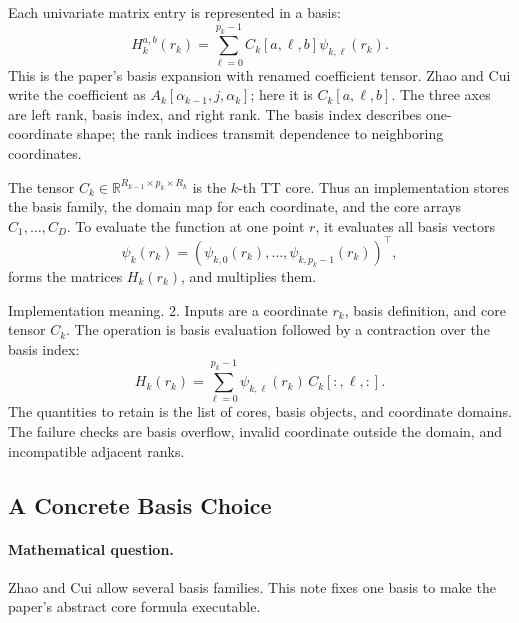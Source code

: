 \documentclass[11pt]{article}
\numberwithin{equation}{section}
\newcommand{\R}{\mathbb R}
\begin{document}
Each univariate matrix entry is represented in a basis:
\begin{equation}
    H_k^{a,b}(r_k)
    =
    \sum_{\ell=0}^{p_k-1}
    C_k[a,\ell,b]\psi_{k,\ell}(r_k).
    \label{eq:p24-tt-3}
\end{equation}
This is the paper's basis expansion with renamed coefficient tensor.  Zhao and Cui \cite{zhao2024ttsequential}
write the coefficient as \(A_k[\alpha_{k-1},j,\alpha_k]\); here it is
\(C_k[a,\ell,b]\).  The three axes are left rank, basis index, and right rank.
The basis index describes one-coordinate shape; the rank indices transmit
dependence to neighboring coordinates.

The tensor \(C_k\in\R^{R_{k-1}\times p_k\times R_k}\) is the \(k\)-th TT core.
Thus an implementation stores the basis family, the domain map for each
coordinate, and the core arrays \(C_1,\ldots,C_D\).  To evaluate the function at
one point \(r\), it evaluates all basis vectors
\[
    \psi_k(r_k)
    =
    (\psi_{k,0}(r_k),\ldots,\psi_{k,p_k-1}(r_k))^\top,
\]
forms the matrices \(H_k(r_k)\), and multiplies them.

Implementation meaning. 2.  Inputs are a coordinate \(r_k\), basis
definition, and core tensor \(C_k\).  The operation is basis evaluation followed
by a contraction over the basis index:
\begin{equation}
    H_k(r_k)=\sum_{\ell=0}^{p_k-1}\psi_{k,\ell}(r_k)\,C_k[:,\ell,:].
    \label{eq:p24-tt-3a}
\end{equation}
The quantities to retain is the list of cores, basis objects, and coordinate
domains.  The failure checks are basis overflow, invalid coordinate outside the
domain, and incompatible adjacent ranks.

\subsection{A Concrete Basis Choice}

\paragraph{Mathematical question.}
Zhao and Cui \cite{zhao2024ttsequential} allow several basis families.  This note fixes one basis to make the
paper's abstract core formula executable.
\end{document}
